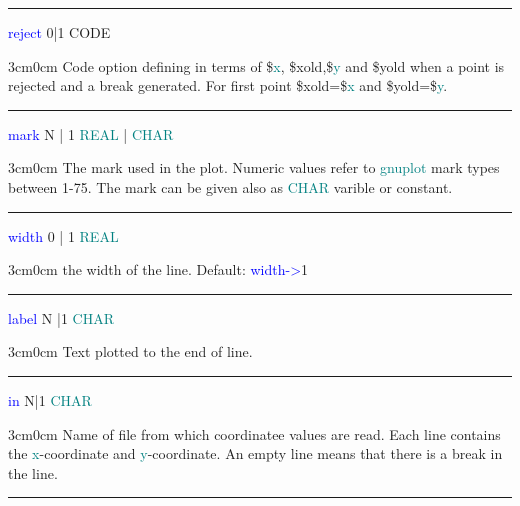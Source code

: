 \vspace{0.3cm} 
\hrule 
\vspace{0.3cm} 
\noindent \textcolor{blue}{reject}  \tabto{3cm} 0|1  \tabto{5cm}  CODE  \tabto{7cm} 
\begin{changemargin}{3cm}{0cm} 
\noindent  Code option defining in terms of \$\textcolor{teal}{x}, \$xold,\$\textcolor{teal}{y} and \$yold when 
a point is rejected and a break generated. For first point \$xold=\$\textcolor{teal}{x} and \$yold=\$\textcolor{teal}{y}. 
\end{changemargin} 
\vspace{0.3cm} 
\hrule 
\vspace{0.3cm} 
\noindent \textcolor{blue}{mark}  \tabto{3cm}  N | 1  \tabto{5cm}   \textcolor{teal}{REAL} | \textcolor{teal}{CHAR}  \tabto{7cm} 
\begin{changemargin}{3cm}{0cm} 
\noindent  The mark used in the plot. 
Numeric values refer to \textcolor{teal}{gnuplot} mark types between 1-75. 
The mark can be given also as \textcolor{teal}{CHAR} varible or constant. 
\end{changemargin} 
\vspace{0.3cm} 
\hrule 
\vspace{0.3cm} 
\noindent \textcolor{blue}{width}  \tabto{3cm}  0 | 1  \tabto{5cm}   \textcolor{teal}{REAL}  \tabto{7cm} 
\begin{changemargin}{3cm}{0cm} 
\noindent  the width of the line. Default: \textcolor{blue}{width->}1 
\end{changemargin} 
\vspace{0.3cm} 
\hrule 
\vspace{0.3cm} 
\noindent \textcolor{blue}{label} \tabto{3cm}  N |1  \tabto{5cm}  \textcolor{teal}{CHAR}  \tabto{7cm} 
\begin{changemargin}{3cm}{0cm} 
\noindent  Text plotted to the end of line. 
\end{changemargin} 
\vspace{0.3cm} 
\hrule 
\vspace{0.3cm} 
\noindent \textcolor{blue}{in}  \tabto{3cm} N|1 \tabto{5cm}  \textcolor{teal}{CHAR}  \tabto{7cm} 
\begin{changemargin}{3cm}{0cm} 
\noindent  Name of file from which coordinatee values are read. Each line contains 
the \textcolor{teal}{x}-coordinate and \textcolor{teal}{y}-coordinate. An empty line means that there is a break in the line. 
\end{changemargin} 
\vspace{0.3cm} 
\hrule 
\vspace{0.3cm} 
